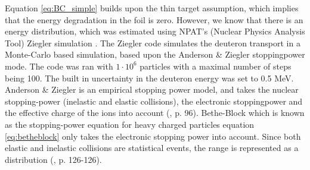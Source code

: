 Equation \ref{eq:BC_simple} builds upon the thin target assumption, which implies that the energy degradation in the foil is zero. However, we know that there is an energy distribution, which was estimated using NPAT's (Nuclear Physics Analysis Tool) Ziegler simulation \cite{MorellJ.}. The Ziegler code simulates the deuteron transport in a Monte-Carlo based simulation, based upon the Anderson \& Ziegler stoppingpower mode\cite{Ziegler1999}. The code was ran with $1\cdot 10^6$ particles with a maximal number of steps being 100. The built in uncertainty in the deuteron energy was set to 0.5 MeV. Anderson \& Ziegler is an empirical stopping power model, and takes the nuclear stopping-power (inelastic and elastic collisions), the electronic stoppingpower and the effective charge of the ions into account (\cite{Backlin1986}, p. 96). Bethe-Block which is known as the stopping-power equation for heavy charged particles {equation \ref{eq:betheblock}} only takes the electronic stopping power into account. %
Since both elastic and inelastic collisions are statistical events, the range is represented as a distribution (\cite{Backlin1986}, p. 126-126). %
